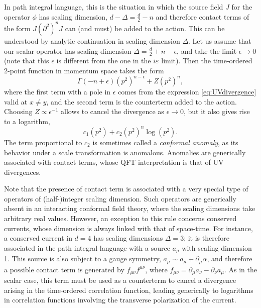 \documentclass[a4paper,12pt]{article}
\numberwithin{equation}{section}
\begin{document}
In path integral language, this is the situation in which the source field $J$ for the operator $\phi$ has scaling dimension, $d - \Delta = \frac{d}{2} - n$ and therefore contact terms of the form $J (\partial^2)^n J$ can (and must) be added to the action. This can be understood by analytic continuation in scaling dimension $\Delta$. Let us assume that our scalar operator has scaling dimension $\Delta = \frac{d}{2} + n - \epsilon$, and take the limit $\epsilon \to 0$ (note that this $\epsilon$ is different from the one in the $i \varepsilon$ limit). Then the time-ordered 2-point function in momentum space takes the form
\begin{equation}
	\Gamma(-n + \epsilon) (p^2)^{n - \epsilon}
	+ Z (p^2)^n,
\end{equation}
where the first term with a pole in $\epsilon$ comes from the expression \eqref{eq:UVdivergence} valid at $x \neq y$, and the second term is the counterterm added to the action.
Choosing $Z \propto \epsilon^{-1}$ allows to cancel the divergence as $\epsilon \to 0$, but it also gives rise to a logarithm, 
\begin{equation}
	c_1 (p^2) + c_2 (p^2)^n \log(p^2).
\end{equation}
The term proportional to $c_2$ is sometimes called a \emph{conformal anomaly}, as its behavior under a scale transformation is anomalous.
Anomalies are generically associated with contact terms, whose QFT interpretation is that of UV divergences.

Note that the presence of contact term is associated with a very special type of operators of (half-)integer scaling dimension. Such operators are generically absent in an interacting conformal field theory, where the scaling dimensions take arbitrary real values. 
However, an exception to this rule concerns conserved currents, whose dimension is always linked with that of space-time. For instance, a conserved current in $d = 4$ has scaling dimensions $\Delta = 3$; it is therefore associated in the path integral language with a source $a_\mu$ with scaling dimension 1. This source is also subject to a gauge symmetry, $a_\mu \sim a_\mu + \partial_\mu \alpha$, and therefore a possible contact term is generated by $f_{\mu\nu} f^{\mu\nu}$, where $f_{\mu\nu} = \partial_\mu a_\nu - \partial_\nu a_\mu$. As in the scalar case, this term must be used as a counterterm to cancel a divergence arising in the time-ordered correlation function, leading generically to logarithms in correlation functions involving the transverse polarization of the current.
\end{document}

